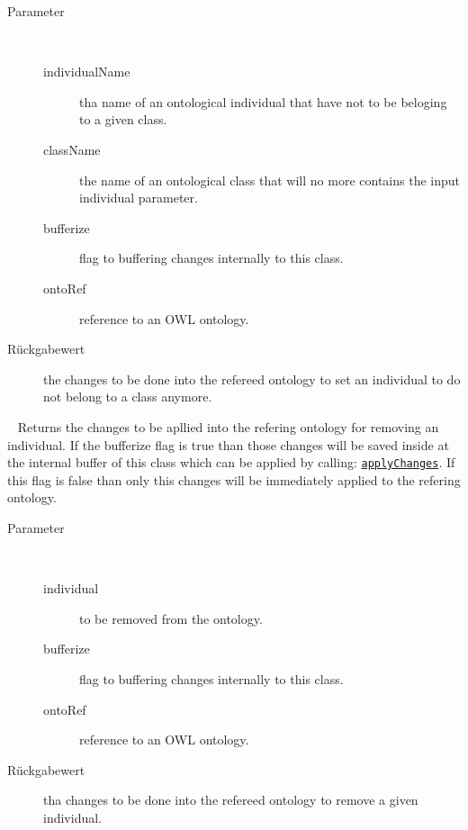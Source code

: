 \begin{description}
\begin{description}
\item[Parameter] ~
\begin{description}
\item[individualName]
tha name of an ontological individual that have not to be beloging to a given class.
\item[className]
the name of an ontological class that will no more contains the input individual parameter.
\item[bufferize]
flag to buffering changes internally to this class.
\item[ontoRef]
reference to an OWL ontology.
\end{description}
\item[Rückgabewert] 
the changes to be done into the refereed ontology to set an individual to do not belong to a class anymore.
\end{description}
\item[{\ltdHypertarget{ontologyFramework.OFContextManagement.OWLLibrary.removeIndividual(org.semanticweb.owlapi.model.OWLNamedIndividual,java.lang.Boolean,ontologyFramework.OFContextManagement.OWLReferences)}{removeIndividual}\label{ontologyFramework.OFContextManagement.OWLLibrary.removeIndividual(org.semanticweb.owlapi.model.OWLNamedIndividual,java.lang.Boolean,ontologyFramework.OFContextManagement.OWLReferences)}}]
~ Returns the changes to be apllied into the refering ontology for 
 removing an individual.
 If the bufferize flag is true than those changes will be saved inside at the
 internal buffer of this class which can be applied by calling:
 \texttt{\hyperlink{ontologyFramework.OFContextManagement.OWLLibrary.applyChanges(ontologyFramework.OFContextManagement.OWLReferences)}{applyChanges}}. If this flag is false than only this
 changes will be immediately applied to the refering ontology.
\begin{description}
\item[Parameter] ~
\begin{description}
\item[individual]
to be removed from the ontology.
\item[bufferize]
flag to buffering changes internally to this class.
\item[ontoRef]
reference to an OWL ontology.
\end{description}
\item[Rückgabewert] 
tha changes to be done into the refereed ontology to remove a given individual.

\end{description}
\end{description}
